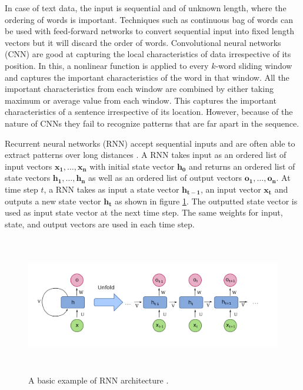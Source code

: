 \documentclass[a4paper, 11pt]{article}
\begin{document}
In case of text data, the input is sequential and of unknown length, where the ordering of words is important. Techniques such as continuous bag of words \parencite{DBLP:journals/corr/abs-1301-3781} can be used with feed-forward networks to convert sequential input into fixed length vectors but it will discard the order of words. Convolutional neural networks (CNN) \parencite{Bengio1997} are good at capturing the local characteristics of data irrespective of its position. In this, a nonlinear function is applied to every $k$-word sliding window and captures the important characteristics of the word in that window. All the important characteristics from each window are combined by either taking maximum or average value from each window. This captures the important characteristics of a sentence irrespective of its location. However, because of the nature of CNNs they fail to recognize patterns that are far apart in the sequence.

Recurrent neural networks (RNN) accept sequential inputs and are often able to extract patterns over long distances \parencite{Elman}. A RNN takes input as an ordered list of input vectors $\mathrm{\mathbf{x_1},\dots,\mathbf{x_n}}$ with initial state vector $\mathbf{h_0}$ and returns an ordered list of state vectors $\mathrm{\mathbf{h_1},\dots,\mathbf{h_n}}$ as well as an ordered list of output vectors $\mathrm{\mathbf{o_1},\dots,\mathbf{o_n}}$. At time step $t$, a RNN takes as input a state vector $\mathbf{h_{t-1}}$, an input vector $\mathbf{x_{t}}$ and outputs a new state vector $\mathbf{h_{t}}$ as shown in figure \ref{fig:A basic RNN architecture}. The outputted state vector is used as input state vector at the next time step. The same weights for input, state, and output vectors are used in each time step.  


\begin{figure}[htpb!]
    \centering
    \includegraphics[width=\textwidth,height=6cm,keepaspectratio=true]
    {Recurrent_neural_network_unfold.png}
    \caption{
        A basic example of RNN architecture \parencite{rnn-1}.
    }
    \label{fig:A basic RNN architecture}
\end{figure}
\end{document}
